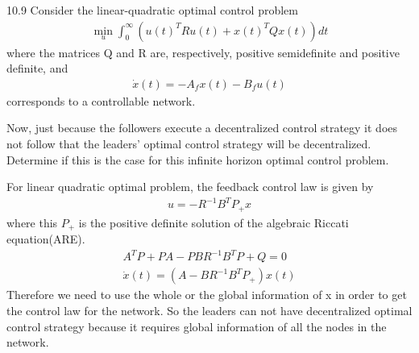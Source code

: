 \documentclass{article}
\begin{document}
\begin{problem} 10.9
    Consider the linear-quadratic optimal control problem
    \begin{align*}
        \min_{u} \int_{0}^{\infty} (u(t)^T R u(t) + x(t)^T Q x(t))dt
    \end{align*}
    where the matrices Q and R are, respectively, positive semideﬁnite and positive definite, and 
    \begin{align*}
        \dot x(t) = -A_f x(t) - B_f u(t) 
    \end{align*}
    corresponds to a controllable network.

    Now, just because the followers execute a decentralized control strategy it does not follow that the leaders’ optimal control strategy will be decentralized. Determine if this is the case for this inﬁnite horizon optimal control problem.

    For linear quadratic optimal problem, the feedback control law is given by
    \begin{align*}
        u = -R^{-1}B^T P_+ x
    \end{align*}
    where this $P_+$ is the positive definite solution of the algebraic Riccati equation(ARE). 
    \begin{align*}
        A^T P + PA - PBR^{-1}B^TP + Q = 0\\
        \dot x(t) = (A-BR^{-1}B^TP_+)x(t)
    \end{align*}
    Therefore we need to use the whole or the global information of x in order to get the control law for the network. So the leaders can not have decentralized optimal control strategy because it requires global information of all the nodes in the network. 

\end{problem}
\end{document}
